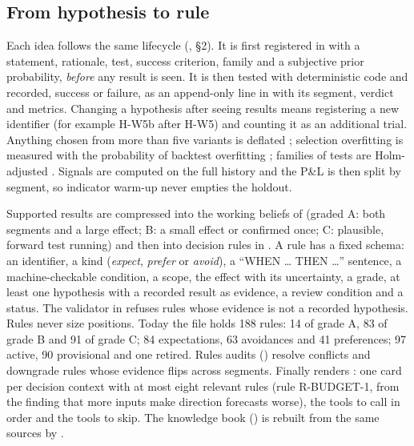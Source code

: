 \documentclass[10pt,a4paper]{article}
\newcommand{\hyp}[1]{\textsf{#1}}
\begin{document}
\subsection{From hypothesis to rule}

Each idea follows the same lifecycle (\protect{}, \S2). It is first registered in \protect{} with a statement, rationale, test, success criterion, family and a subjective prior probability, \emph{before} any result is seen. It is then tested with deterministic code and recorded, success or failure, as an append-only line in \protect{} with its segment, verdict and metrics. Changing a hypothesis after seeing results means registering a new identifier (for example \hyp{H-W5b} after \hyp{H-W5}) and counting it as an additional trial. Anything chosen from more than five variants is deflated \citep{bailey2014dsr}; selection overfitting is measured with the probability of backtest overfitting \citep{bailey2017pbo}; families of tests are Holm-adjusted \citep{holm1979}. Signals are computed on the full history and the P\&L is then split by segment, so indicator warm-up never empties the holdout.

Supported results are compressed into the working beliefs of \protect{} (graded A: both segments and a large effect; B: a small effect or confirmed once; C: plausible, forward test running) and then into decision rules in \protect{}. A rule has a fixed schema: an identifier, a kind (\emph{expect}, \emph{prefer} or \emph{avoid}), a ``WHEN \dots{} THEN \dots'' sentence, a machine-checkable condition, a scope, the effect with its uncertainty, a grade, at least one hypothesis with a recorded result as evidence, a review condition and a status. The validator in \protect{} refuses rules whose evidence is not a recorded hypothesis. Rules never size positions. Today the file holds 188 rules: 14 of grade A, 83 of grade B and 91 of grade C; 84 expectations, 63 avoidances and 41 preferences; 97 active, 90 provisional and one retired. Rules audits (\protect{}) resolve conflicts and downgrade rules whose evidence flips across segments. Finally \protect{} renders \protect{}: one card per decision context with at most eight relevant rules (rule R-BUDGET-1, from the finding that more inputs make direction forecasts worse), the tools to call in order and the tools to skip. The knowledge book (\protect{}) is rebuilt from the same sources by \protect{}.
\end{document}
